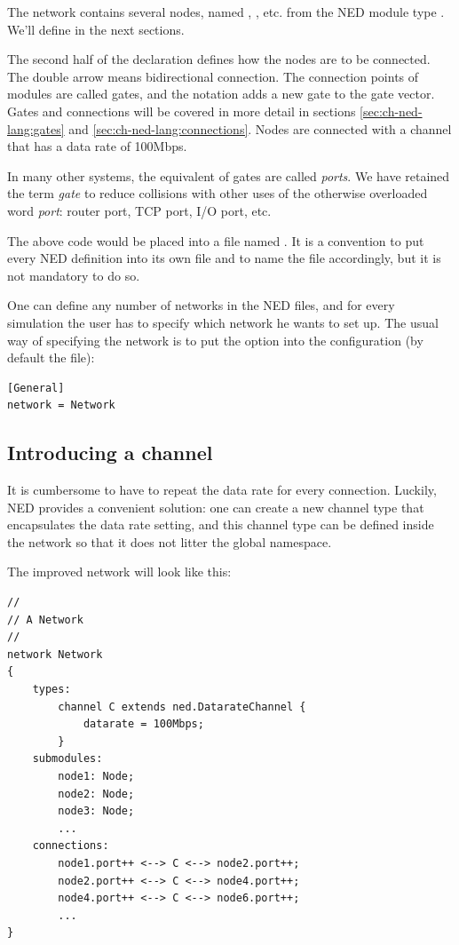 The network contains several nodes, named , , etc.
from the NED module type . We'll define  in the next
sections.

The second half of the declaration defines how the nodes are to be
connected. The double arrow means bidirectional connection. The connection
points of modules are called gates, and the  notation adds a
new gate to the  gate vector. Gates and connections will be
covered in more detail in sections \ref{sec:ch-ned-lang:gates} and
\ref{sec:ch-ned-lang:connections}. Nodes are connected with a channel that
has a data rate of 100Mbps.

\begin{note}
    In many other systems, the equivalent of {\opp} gates are called
    \textit{ports}. We have retained the term \textit{gate} to reduce
    collisions with other uses of the otherwise overloaded word
    \textit{port}: router port, TCP port, I/O port, etc.
\end{note}

The above code would be placed into a file named . It is
a convention to put every NED definition into its own file and to name the
file accordingly, but it is not mandatory to do so.

One can define any number of networks in the NED files, and for every
simulation the user has to specify which network he wants to set up.
The usual way of specifying the network is to put the 
option into the configuration (by default the  file):

\begin{Verbatim}
[General]
network = Network
\end{Verbatim}


\subsection{Introducing a channel}

It is cumbersome to have to repeat the data rate for every connection.
Luckily, NED provides a convenient solution: one can create a new channel
type that encapsulates the data rate setting, and this channel type can
be defined inside the network so that it does not litter the global
namespace.

The improved network will look like this:

\begin{Verbatim}
//
// A Network
//
network Network
{
    types:
        channel C extends ned.DatarateChannel {
            datarate = 100Mbps;
        }
    submodules:
        node1: Node;
        node2: Node;
        node3: Node;
        ...
    connections:
        node1.port++ <--> C <--> node2.port++;
        node2.port++ <--> C <--> node4.port++;
        node4.port++ <--> C <--> node6.port++;
        ...
}
\end{Verbatim}

